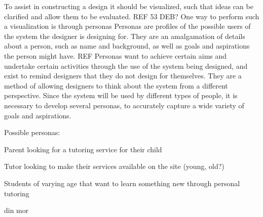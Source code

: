 To assist in constructing a design it should be visualized, such that ideas can be clarified and allow them to be evaluated. REF 53 DEB?
One way to perform such a visualization is through personas
Personas are profiles of the possible users of the system the designer is designing for.
They are an amalgamation of details about a person, such as name and background, as well as goals and aspirations the person might have. REF
Personas want to achieve certain aims and undertake certain activities through the use of the system being designed, and exist to remind designers that they do not design for themselves.
They are a method of allowing designers to think about the system from a different perspective.
Since the system will be used by different types of people, it is necessary to develop several personas, to accurately capture a wide variety of goals and aspirations.

Possible personas:
\begin{}
    \item Parent looking for a tutoring service for their child
    \item Tutor looking to make their services available on the site (young, old?)
    \item Students of varying age that want to learn something new through personal tutoring
    \item din mor
\end{}
